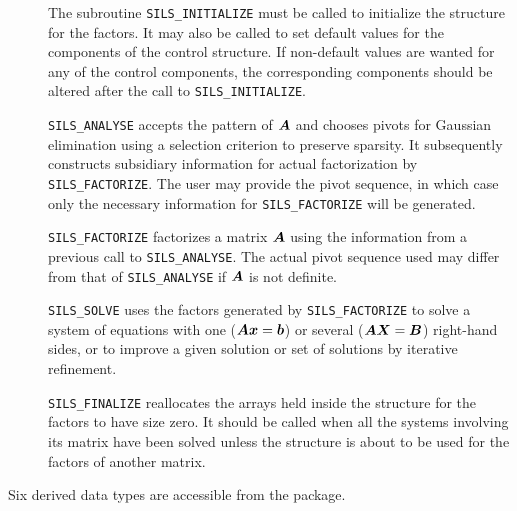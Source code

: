 \documentclass{galahad}
\newcommand{\packagename}{SILS}
\begin{document}
\begin{description} 
 
\item[] The subroutine {\tt \packagename\_INITIALIZE} must be called to 
initialize the 
structure for the factors. It may also be called to set default values 
for the components of the control structure. If non-default values are 
wanted for any of the control components, the corresponding components 
should be altered after the call to {\tt \packagename\_INITIALIZE}. 
  
\item[] {\tt \packagename\_ANALYSE} accepts the pattern of ${\bm{A}}$ 
 and chooses  pivots 
 for Gaussian elimination using a selection criterion to preserve 
 sparsity.  It subsequently constructs subsidiary information for 
 actual factorization by {\tt \packagename\_FACTORIZE}. The user may provide
 the pivot sequence, in which case only the necessary information for 
 {\tt \packagename\_FACTORIZE} will be generated. 
 
\item[] {\tt \packagename\_FACTORIZE} factorizes a matrix ${\bm{A}}$ using the 
information 
 from a previous call to {\tt \packagename\_ANALYSE}. The actual pivot sequence 
 used may differ from that of {\tt \packagename\_ANALYSE} if ${\bm{A}}$ is not 
definite. 
 
\item[] {\tt \packagename\_SOLVE} uses the factors generated by 
  {\tt \packagename\_FACTORIZE} to 
  solve a system of equations with one (${\bm{A}} {\bm{x}} = {\bm{b}}$) 
  or several (${\bm{A}} {\bm{X}} = {\bm{B}}$) right-hand sides, 
  or to improve a given solution or set of solutions 
  by iterative refinement. 
 
\item[] {\tt \packagename\_FINALIZE} reallocates the arrays held inside the  
  structure for the factors to have size zero. It should be called 
  when all the systems involving its matrix have been solved unless 
  the structure is about to be used for the factors of another matrix. 
  
\end{description} 






\galtypes
Six derived data types are accessible from the package.
\end{document}
